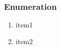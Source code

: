 
\begin{frame}
\frametitle{Enumeration}
	\begin{enumerate}
		\item item1
		\item item2
	\end{enumerate}
\end{frame}
